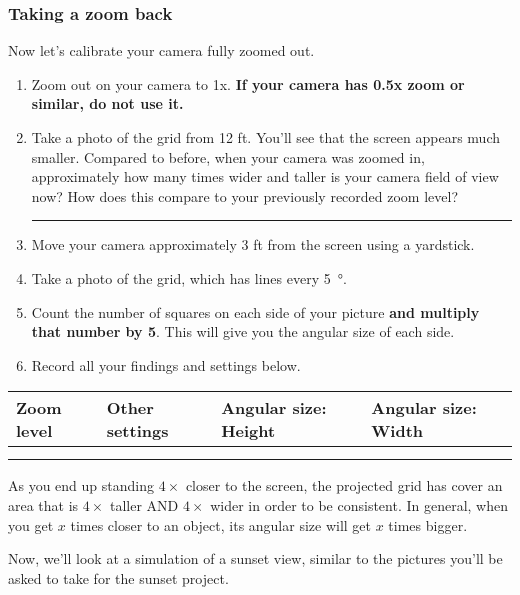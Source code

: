 \documentclass[main.tex]{subfiles}
\begin{document}
\subsubsection{Taking a zoom back}
Now let's calibrate your camera fully zoomed out. 
\begin{enumerate}
\item Zoom out on your camera to 1x. \textbf{If your camera has 0.5x zoom or similar, do not use it.}
\item Take a photo of the grid from 12 ft. You'll see that the screen appears much smaller. Compared to before, when your camera was zoomed in, approximately how many times wider and taller is your camera field of view now? How does this compare to your previously recorded zoom level?\\

\rule{15cm}{.2mm}
\item Move your camera approximately 3 ft from the screen using a yardstick.  
\item Take a photo of the  grid, which has lines every \SI{5}{\degree}.
\item Count the number of squares on each side of your picture \textbf{and multiply that number by 5}. This will give you the angular size of each side.
\item Record all your findings and settings below.
\end{enumerate}

\begin{center}
\begin{tabular}{|p{2.5cm}|p{3cm}|p{4cm}|p{4cm}|}\hline
Zoom level & Other settings & Angular size: Height & Angular size: Width\\\hline
&&&\\
&&&\\\hline
\end{tabular}
\end{center}

As you end up standing $4\times$ closer to the screen, the projected grid has cover an area that is $4\times$ taller AND $4\times$ wider in order to be consistent. In general, when you get $x$ times closer to an object, its angular size will get $x$ times bigger.

Now, we'll look at a simulation of a sunset view, similar to the pictures you'll be asked to take for the sunset project.
\end{document}
